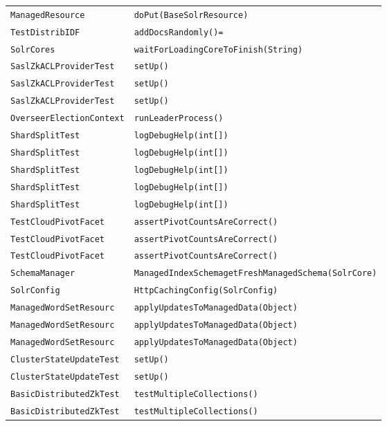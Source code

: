 \begin{center}
\begin{longtable}{ll}
\lstinline/ManagedResource/&{\lstinline/doPut(BaseSolrResource)/}\\
\lstinline/TestDistribIDF/&{\lstinline/addDocsRandomly()=/}\\
\lstinline/SolrCores/&{\lstinline/waitForLoadingCoreToFinish(String)/}\\
\lstinline/SaslZkACLProviderTest/&{\lstinline/setUp()/}\\
\lstinline/SaslZkACLProviderTest/&{\lstinline/setUp()/}\\
\lstinline/SaslZkACLProviderTest/&{\lstinline/setUp()/}\\
\lstinline/OverseerElectionContext/&{\lstinline/runLeaderProcess()/}\\
\lstinline/ShardSplitTest/&{\lstinline/logDebugHelp(int[])/}\\
\lstinline/ShardSplitTest/&{\lstinline/logDebugHelp(int[])/}\\
\lstinline/ShardSplitTest/&{\lstinline/logDebugHelp(int[])/}\\
\lstinline/ShardSplitTest/&{\lstinline/logDebugHelp(int[])/}\\
\lstinline/ShardSplitTest/&{\lstinline/logDebugHelp(int[])/}\\
\lstinline/TestCloudPivotFacet/&{\lstinline/assertPivotCountsAreCorrect()/}\\
\lstinline/TestCloudPivotFacet/&{\lstinline/assertPivotCountsAreCorrect()/}\\
\lstinline/TestCloudPivotFacet/&{\lstinline/assertPivotCountsAreCorrect()/}\\
\lstinline/SchemaManager/&{\lstinline/ManagedIndexSchemagetFreshManagedSchema(SolrCore)/}\\
\lstinline/SolrConfig/&{\lstinline/HttpCachingConfig(SolrConfig)/}\\
\lstinline/ManagedWordSetResourc/&{\lstinline/applyUpdatesToManagedData(Object)/}\\
\lstinline/ManagedWordSetResourc/&{\lstinline/applyUpdatesToManagedData(Object)/}\\
\lstinline/ManagedWordSetResourc/&{\lstinline/applyUpdatesToManagedData(Object)/}\\
\lstinline/ClusterStateUpdateTest/&{\lstinline/setUp()/}\\
\lstinline/ClusterStateUpdateTest/&{\lstinline/setUp()/}\\
\lstinline/BasicDistributedZkTest/&{\lstinline/testMultipleCollections()/}\\
\lstinline/BasicDistributedZkTest/&{\lstinline/testMultipleCollections()/}\\

\end{longtable}
\end{center}
